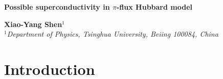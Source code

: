 \documentclass[12pt]{article}
\numberwithin{equation}{section}
\begin{document}
	
	\vspace*{-.6in} \thispagestyle{empty}
	\begin{flushright}
	\end{flushright}
	
	\vspace{.2in} {\large
		\begin{center}
			\bf  Possible superconductivity in $\pi$-flux Hubbard model
		\end{center}
	}
	\vspace{.2in}
	\begin{center}
		{\bf 
			Xiao-Yang Shen$^{1}$
		} 
		\\
		\vspace{.2in} 
		{\it $^{1}$Department of Physics, Tsinghua University, Beiing 100084, China}
	\end{center}

	\vspace{.2in}


\begin{abstract}
  
  
\end{abstract}
\vspace{.3in}
\hspace{0.7cm} 
\section{Introduction}
\end{document}
